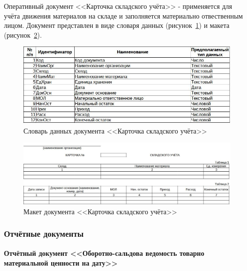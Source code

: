 \documentclass[12pt, a4paper, simple]{eskdtext}
\begin{document}
    Оперативный документ <<Карточка складского учёта>> - применяется для учёта движения материалов на складе
    и заполняется материально отвественным лицом.
    Документ представлен в виде словаря данных (рисунок~\ref{fig:OP_KartSklYch_tipi})
    и макета (рисунок~\ref{fig:OP_KartSklYch_maket}).

    \begin{figure}[!h]
        \centering
        \includegraphics[width=14cm]
            {_docs/ОП_КартСклУч_типы.jpg}
        \caption{Словарь данных документа <<Карточка складского учёта>>}
        \label{fig:OP_KartSklYch_tipi}
    \end{figure}

    \begin{figure}[!h]
        \centering
        \includegraphics[width=14cm]
            {_docs/ОП_КартСклУч_макет.jpg}
        \caption{Макет документа <<Карточка складского учёта>>}
        \label{fig:OP_KartSklYch_maket}
    \end{figure}
    
    \newpage

    \subsubsection{Отчётные документы}

    \paragraph{} \textbf{Отчётный документ <<Оборотно-сальдова ведомость товарно материальной ценности на дату>>}
\end{document}
